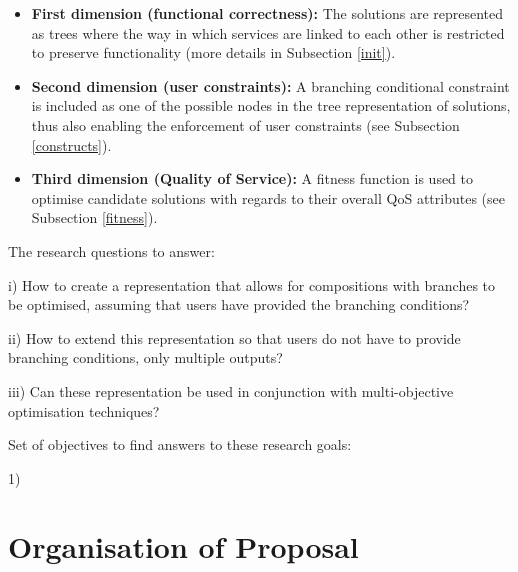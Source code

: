 \begin{itemize}
 \item \textbf{First dimension (functional correctness):} The solutions are represented as trees where the way in which services are linked
 to each other is restricted to preserve functionality (more details in Subsection \ref{init}).
 \item \textbf{Second dimension (user constraints):} A branching conditional constraint is included as one of the possible nodes in the tree
 representation of solutions, thus also enabling the enforcement of user constraints (see Subsection \ref{constructs}).
 \item \textbf{Third dimension (Quality of Service):} A fitness function is used to optimise candidate solutions with regards to their overall
 QoS attributes (see Subsection \ref{fitness}).
\end{itemize}

The research questions to answer:

i) How to create a representation that allows for
compositions with branches to be optimised, assuming
that users have provided the branching conditions?

ii) How to extend this representation so that users
do not have to provide branching conditions, only multiple outputs?

iii) Can these representation be used in conjunction with
multi-objective optimisation techniques?

Set of objectives to find answers to these research goals:

1)


\section{Organisation of Proposal}
